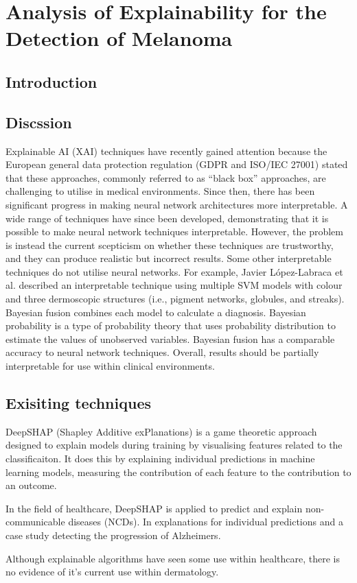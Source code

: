 \chapter{Analysis of Explainability for the Detection of Melanoma}

\section{Introduction}

\section{Discssion}
Explainable AI (XAI) techniques have recently gained attention because the European general data protection regulation (GDPR and ISO/IEC 27001) stated that these approaches, commonly referred to as ``black box'' approaches, are challenging to utilise in medical environments. Since then, there has been significant progress in making neural network architectures more interpretable. A wide range of techniques\cite{Fuji2019,  Selvaraju2016, Ribeiro2016} have since been developed, demonstrating that it is possible to make neural network techniques interpretable. However, the problem is instead the current scepticism on whether these techniques are trustworthy\cite{Tjoa2019, Samek2019a}, and they can produce realistic but incorrect results\cite{Ghorbani2019}. Some other interpretable techniques do not utilise neural networks. For example, Javier López-Labraca et al.\cite{Lopez-Labraca2018} described an interpretable technique using multiple SVM models with colour and three dermoscopic structures (i.e., pigment networks, globules, and streaks). Bayesian fusion combines each model to calculate a diagnosis. Bayesian probability is a type of probability theory that uses probability distribution to estimate the values of unobserved variables. Bayesian fusion has a comparable accuracy to neural network techniques\cite{Takruri2017}. Overall, results should be partially interpretable for use within clinical environments.


\section{Exisiting techniques}
DeepSHAP (Shapley Additive exPlanations) is a game theoretic approach designed to explain models during training by visualising features related to the classificaiton. It does this by explaining individual predictions in machine learning models, measuring the contribution of each feature to the contribution to an outcome\cite{Aas2021}.

In the field of healthcare, DeepSHAP is applied to predict and explain non-communicable diseases (NCDs). In explanations for individual predictions and a case study detecting the progression of Alzheimers. 

Although explainable algorithms have seen some use within healthcare, there is no evidence of it's current use within dermatology.



